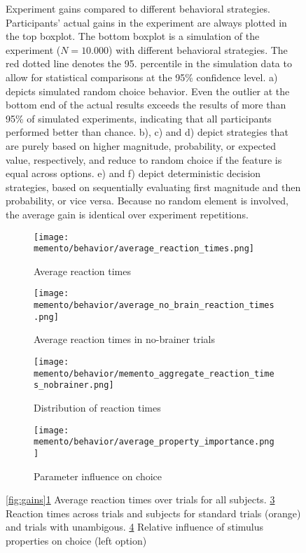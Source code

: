 \begin{figure}
	\caption[Experiment gains compared to different behavioral strategies]{Experiment gains compared to different behavioral strategies. Participants' actual gains in the experiment are always plotted in the top boxplot. The bottom boxplot is a simulation of the experiment ($N=10.000$) with different behavioral strategies. The red dotted line denotes the 95. percentile in the simulation data to allow for statistical comparisons at the 95\% confidence level. a) depicts simulated random choice behavior. Even the outlier at the bottom end of the actual results exceeds the results of more than 95\% of simulated experiments, indicating that all participants performed better than chance. b), c) and d) depict strategies that are purely based on higher magnitude, probability, or expected value, respectively, and reduce to random choice if the feature is equal across options. e) and f) depict deterministic decision strategies, based on sequentially evaluating first magnitude and then probability, or vice versa. Because no random element is involved, the average gain is identical over experiment repetitions.}
\end{figure}



\begin{figure}
	\centering
	\begin{subfigure}[t]{0.4\textwidth}
		\texttt{[image: memento/behavior/average\_reaction\_times.png]}
		\caption{Average reaction times}
		\label{fig:avgreactions}
	\end{subfigure}
	\begin{subfigure}[t]{0.4\textwidth}
		\texttt{[image: memento/behavior/average\_no\_brain\_reaction\_times.png]}
		\caption{Average reaction times in no-brainer trials}
		\label{fig:avgreactionsnobrain}
	\end{subfigure}
	\begin{subfigure}[t]{0.45\textwidth}
		\texttt{[image: memento/behavior/memento\_aggregate\_reaction\_times\_nobrainer.png]}
		\caption{Distribution of reaction times}
		\label{fig:reactiontimes}
	\end{subfigure}
	\begin{subfigure}[t]{0.45\textwidth}
		\texttt{[image: memento/behavior/average\_property\_importance.png]}
		\caption{Parameter influence on choice}
		\label{fig:logregbehavior}
	\end{subfigure}

	\caption[Behavioral results]{\ref{fig:gains}\ref{fig:avgreactions} Average reaction times over trials for all subjects. \ref{fig:reactiontimes} Reaction times across trials and subjects for standard trials (orange) and trials with unambigous. \ref{fig:logregbehavior} Relative influence of stimulus properties on choice (left option)}
	\label{fig:behav}
\end{figure}

